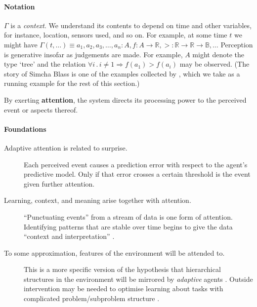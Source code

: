 \paragraph{\textbf{\upshape Notation}}

$\Gamma$ is a \emph{context}.  We understand its contents to depend on
time and other variables, for instance, location, sensors used, and so
on.  For example, at some time $t$ we might have $\Gamma(t,\ldots)
\equiv a_1, a_2, a_3, \ldots, a_n : A, f:A\rightarrow \mathbb{R},
>:\mathbb{R}\rightarrow\mathbb{R}\rightarrow \mathbb{B}, \ldots$
Perception is generative insofar as judgements are made.  For example,
$A$ might denote the type `tree' and the relation $\forall i
\mathbin{.} i\neq 1 \Rightarrow f(a_1)>f(a_i)$ may be observed.  (The story of Simcha Blass is one of the examples collected by \citet{van1994anatomy}, which we take as a running example for the rest of this section.)

\begin{center}
\asterism
\end{center}

\begin{defn}\label{def:attention}
\hypertarget{def:attention}{}By exerting \textbf{attention}, the system directs its processing power to the perceived event or aspects thereof.
\end{defn}

\paragraph{\textbf{\upshape Foundations}}

\begin{description}
\item[Adaptive attention is related to surprise.] Each perceived event causes a prediction error with respect to the agent's predictive model. Only if that error crosses a certain threshold is the event given further attention.
\item[Learning, context, and meaning arise together with attention.]
  ``Punctuating events'' \cite[p.~301]{bateson-logical-categories}
  from a stream of data is one form of attention.  Identifying
  patterns that are stable over time begins to give the data
  ``context and interpretation'' \cite{rowley2007wisdom}.
\item[To some approximation, features of the environment will be attended to.] This is a more specific version of the hypothesis
  that hierarchical structures in the environment will be mirrored by
  \emph{adaptive} agents \cite{simon1962architecture,simon1995near}.
  Outside intervention may be needed to optimise learning about tasks
  with complicated problem/subproblem structure
  \cite{goldenberg2004may}.
\end{description}

